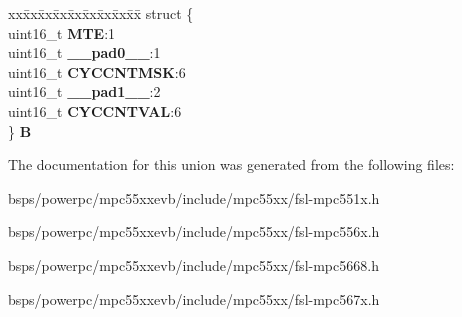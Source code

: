\begin{DoxyCompactItemize}
\begin{tabbing}
\end{tabbing}\item 
\mbox{\label{unionuMTSCFR_ac9ae10cb78a0b0751f3908312ea694ad}} 
\begin{tabbing}
xx\=xx\=xx\=xx\=xx\=xx\=xx\=xx\=xx\=\kill
struct \{\\
\>uint16\_t {\bfseries MTE}:1\\
\>uint16\_t {\bfseries \_\_pad0\_\_}:1\\
\>uint16\_t {\bfseries CYCCNTMSK}:6\\
\>uint16\_t {\bfseries \_\_pad1\_\_}:2\\
\>uint16\_t {\bfseries CYCCNTVAL}:6\\
\} {\bfseries B}\\

\end{tabbing}\end{DoxyCompactItemize}


The documentation for this union was generated from the following files\+:\begin{DoxyCompactItemize}
\item 
bsps/powerpc/mpc55xxevb/include/mpc55xx/fsl-\/mpc551x.\+h\item 
bsps/powerpc/mpc55xxevb/include/mpc55xx/fsl-\/mpc556x.\+h\item 
bsps/powerpc/mpc55xxevb/include/mpc55xx/fsl-\/mpc5668.\+h\item 
bsps/powerpc/mpc55xxevb/include/mpc55xx/fsl-\/mpc567x.\+h\end{DoxyCompactItemize}
